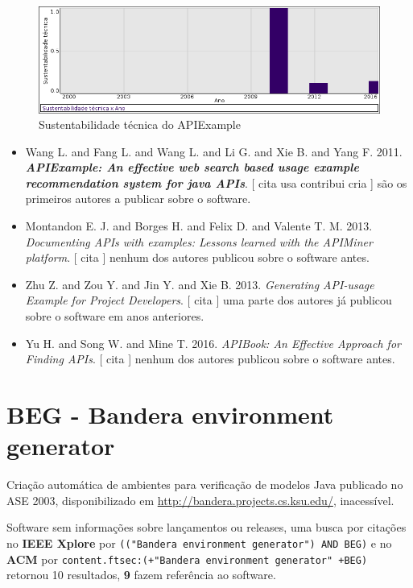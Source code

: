 \begin{figure}[h]
  \center
  \includegraphics[scale=0.50]{imagens/softwares-charts/apiexample.png}
  \caption{Sustentabilidade técnica do APIExample}
\end{figure}


\begin{itemize}
\item Wang L. and Fang L. and Wang L. and Li G. and Xie B. and Yang F.
      2011.
        \textbf{\textit{ APIExample: An effective web search based usage example recommendation system for java APIs}}.
      [
          cita
          usa
          contribui
          cria
      ]
são os primeiros autores a publicar sobre o software.
\item Montandon E. J. and Borges H. and Felix D. and Valente T. M.
      2013.
        \textit{ Documenting APIs with examples: Lessons learned with the APIMiner platform}.
      [
          cita
      ]
nenhum dos autores publicou sobre o software antes.
\item Zhu Z. and Zou Y. and Jin Y. and Xie B.
      2013.
        \textit{ Generating API-usage Example for Project Developers}.
      [
          cita
      ]
uma parte dos autores já publicou sobre o software em anos anteriores.
\item Yu H. and Song W. and Mine T.
      2016.
        \textit{ APIBook: An Effective Approach for Finding APIs}.
      [
          cita
      ]
nenhum dos autores publicou sobre o software antes.
\end{itemize}
\section{BEG - Bandera environment generator}

Criação automática de ambientes para verificação de modelos Java
publicado no ASE 2003,
disponibilizado em \url{http://bandera.projects.cs.ksu.edu/},
inacessível.

Software sem informações sobre lançamentos ou releases,
uma busca por citações no {\bf IEEE Xplore} por
\texttt{(("Bandera environment generator") AND BEG)}
e no {\bf ACM} por
\texttt{content.ftsec:(+"Bandera environment generator" +BEG)}
retornou
10 resultados,
{\bf 9} fazem referência ao software.


